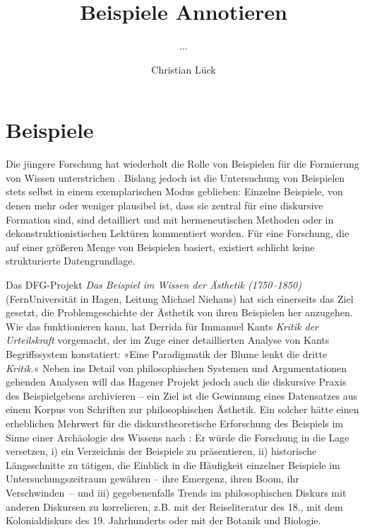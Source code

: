 \documentclass{article}
\newcommand*{\lit}{\textit}%
\begin{document}

  \author*[1]{Christian Lück}%
  \title{Beispiele Annotieren}%
  \subtitle{...}%
  \dedication{...}
  \aop

\maketitle

\section{Beispiele}

Die jüngere Forschung hat wiederholt die Rolle von Beispielen für die
Formierung von Wissen
unterstrichen \parencite{Ruchatz2007a,Schaub2010a,CL2013a,ZB}. Bislang
jedoch ist die Untersuchung von Beispielen stets selbst in einem
exemplarischen Modus geblieben: Einzelne Beispiele, von denen mehr
oder weniger plausibel ist, dass sie zentral für eine diskursive
Formation sind, sind detailliert und mit hermeneutischen Methoden oder
in dekonstruktionistischen Lektüren kommentiert worden. Für eine
Forschung, die auf einer größeren Menge von Beispielen basiert,
existiert schlicht keine strukturierte Datengrundlage.

Das DFG-Projekt \textit{Das Beispiel im Wissen der Ästhetik
  (1750--1850)} (FernUniversität in Hagen, Leitung Michael Niehaus)
hat sich einerseits das Ziel gesetzt, die Problemgeschichte der
Ästhetik von ihren Beispielen her anzugehen. Wie das funktionieren
kann, hat Derrida für Immanuel Kants \lit{Kritik der Urteilskraft}
vorgemacht, der im Zuge einer detaillierten Analyse von Kants
Begriffssystem konstatiert: »Eine Paradigmatik der Blume lenkt die
dritte \emph{Kritik}.« \Parencite[107]{Derrida1992} Neben ins Detail
von philosophischen Systemen und Argumentationen gehenden Analysen
will das Hagener Projekt jedoch auch die diskursive Praxis des
Beispielgebens archivieren -- ein Ziel ist die Gewinnung eines
Datensatzes aus einem Korpus von Schriften zur philosophischen
Ästhetik. Ein solcher hätte einen erheblichen Mehrwert für die
diskurstheoretische Erforschung des Beispiels im Sinne einer
Archäologie des Wissens nach \textcite{Fouc1997a}: Er würde die
Forschung in die Lage versetzen, i) ein Verzeichnis der Beispiele zu
präsentieren, ii) historische Längsschnitte zu tätigen, die Einblick
in die Häufigkeit einzelner Beispiele im Untersuchungszeitraum
gewähren -- ihre Emergenz, ihren Boom, ihr Verschwinden~-- und iii)
gegebenenfalls Trends im philosophischen Diskurs mit anderen Diskursen
zu korrelieren, z.B. mit der Reiseliteratur des 18., mit dem
Kolonialdiskurs des 19. Jahrhunderts oder mit der Botanik und
Biologie.
\end{document}
